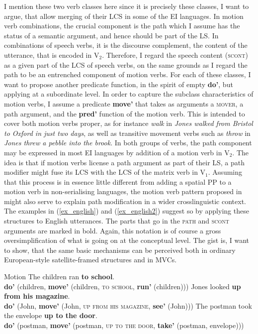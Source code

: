 I mention these two verb classes here since it is precisely these classes, I want to argue, that allow merging of their LCS in some of the EI languages. In motion verb combinations, the crucial component is the path which I assume has the status of a semantic argument, and hence should be part of the LS. In combinations of speech verbs, it is the discourse complement, the content of the utterance, that is encoded in V$_2$. Therefore, I regard the speech content (\textsc{scont}) as a given part of the LCS of speech verbs, on the same grounds as I regard the path to be an entrenched component of motion verbs. For each of these classes, I want to propose another predicate function, in the spirit of empty \textbf{do'}, but applying at a subordinate level. In order to capture the subclass characteristics of motion verbs, I assume a predicate \textbf{move'} that takes as arguments a \textsc{mover}, a path argument, and the \textbf{pred'} function of the motion verb. This is intended to cover both motion verbs proper, as for instance \textit{walk} in \textit{Jones walked from Bristol to Oxford in just two days}, as well as transitive movement verbs such as \textit{throw} in \textit{Jones threw a pebble into the brook}. In both groups of verbs, the path component may be expressed in most EI languages by addition of a motion verb in V$_2$. The idea is that if motion verbs license a path argument as part of their LS, a path modifier might fuse its LCS with the LCS of the matrix verb in V$_1$. Assuming that this process is in essence little different from adding a spatial PP to a motion verb in non-serialising languages, the motion verb pattern proposed in  might also serve to explain path modification in a wider crosslinguistic context. The examples in (\ref{ex_english}) and (\ref{ex_english2}) suggest so by applying these structures to English utterances. The parts that go in the \textsc{path} and \textsc{scont} arguments are marked in bold. Again, this notation is of course a gross oversimplification of what is going on at the conceptual level. The gist is, I want to show, that the same basic mechanisms can be perceived both in ordinary European-style satellite-framed structures and in MVCs.

\ea Motion \label{ex_english}
\ea The children ran \textbf{to school}. \\
\textbf{do'} (children, \textbf{move'} (children, \textsc{to school}, \textbf{run'} (children)))
\ex Jones looked \textbf{up from his magazine}. \\
\textbf{do'} (John, \textbf{move'} (John, \textsc{up from his magazine}, \textbf{see'} (John)))
\ex The postman took the envelope \textbf{up to the door}. \\
\textbf{do'} (postman, \textbf{move'} (postman, \textsc{up to the door}, \textbf{take'} (postman, envelope)))
\z
\z

